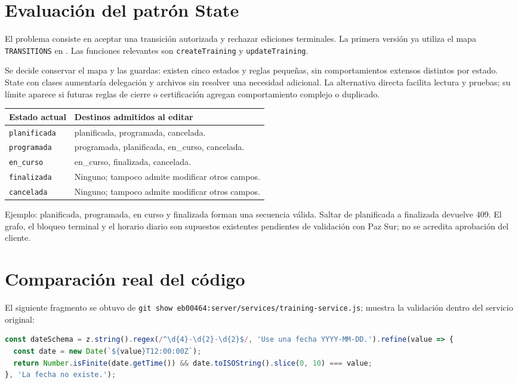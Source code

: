 \section{Evaluación del patrón State}
El problema consiste en aceptar una transición autorizada y rechazar ediciones terminales. La primera versión ya utiliza el mapa \texttt{TRANSITIONS} en . Las funciones relevantes son \texttt{createTraining} y \texttt{updateTraining}.

Se decide conservar el mapa y las guardas: existen cinco estados y reglas pequeñas, sin comportamientos extensos distintos por estado. State con clases aumentaría delegación y archivos sin resolver una necesidad adicional. La alternativa directa facilita lectura y pruebas; su límite aparece si futuras reglas de cierre o certificación agregan comportamiento complejo o duplicado.

\begin{longtable}{P{0.28\textwidth}P{0.64\textwidth}}
\toprule
Estado actual & Destinos admitidos al editar \\
\midrule
\endhead
\texttt{planificada} & planificada, programada, cancelada. \\
\texttt{programada} & programada, planificada, en\_curso, cancelada. \\
\texttt{en\_curso} & en\_curso, finalizada, cancelada. \\
\texttt{finalizada} & Ninguno; tampoco admite modificar otros campos. \\
\texttt{cancelada} & Ninguno; tampoco admite modificar otros campos. \\
\bottomrule
\end{longtable}

Ejemplo: planificada, programada, en curso y finalizada forman una secuencia válida. Saltar de planificada a finalizada devuelve 409. El grafo, el bloqueo terminal y el horario diario son supuestos existentes pendientes de validación con Paz Sur; no se acredita aprobación del cliente.

\section{Comparación real del código}
El siguiente fragmento se obtuvo de \texttt{git show eb00464:server/services/training-service.js}; muestra la validación dentro del servicio original:

\begin{lstlisting}[language=JavaScript,caption={Antes: validación dentro del servicio en eb00464}]
const dateSchema = z.string().regex(/^\d{4}-\d{2}-\d{2}$/, 'Use una fecha YYYY-MM-DD.').refine(value => {
  const date = new Date(`${value}T12:00:00Z`);
  return Number.isFinite(date.getTime()) && date.toISOString().slice(0, 10) === value;
}, 'La fecha no existe.');
\end{lstlisting}

